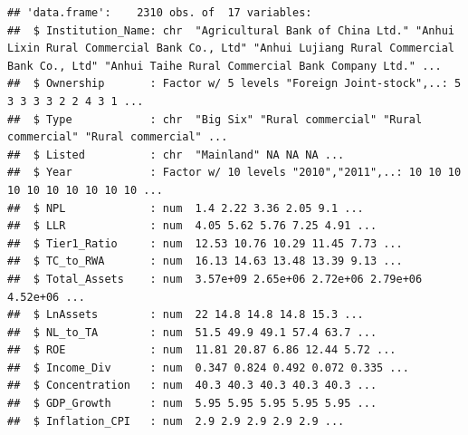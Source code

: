 \documentclass{article}
\begin{document}
\begin{verbatim}
## 'data.frame':    2310 obs. of  17 variables:
##  $ Institution_Name: chr  "Agricultural Bank of China Ltd." "Anhui Lixin Rural Commercial Bank Co., Ltd" "Anhui Lujiang Rural Commercial Bank Co., Ltd" "Anhui Taihe Rural Commercial Bank Company Ltd." ...
##  $ Ownership       : Factor w/ 5 levels "Foreign Joint-stock",..: 5 3 3 3 3 2 2 4 3 1 ...
##  $ Type            : chr  "Big Six" "Rural commercial" "Rural commercial" "Rural commercial" ...
##  $ Listed          : chr  "Mainland" NA NA NA ...
##  $ Year            : Factor w/ 10 levels "2010","2011",..: 10 10 10 10 10 10 10 10 10 10 ...
##  $ NPL             : num  1.4 2.22 3.36 2.05 9.1 ...
##  $ LLR             : num  4.05 5.62 5.76 7.25 4.91 ...
##  $ Tier1_Ratio     : num  12.53 10.76 10.29 11.45 7.73 ...
##  $ TC_to_RWA       : num  16.13 14.63 13.48 13.39 9.13 ...
##  $ Total_Assets    : num  3.57e+09 2.65e+06 2.72e+06 2.79e+06 4.52e+06 ...
##  $ LnAssets        : num  22 14.8 14.8 14.8 15.3 ...
##  $ NL_to_TA        : num  51.5 49.9 49.1 57.4 63.7 ...
##  $ ROE             : num  11.81 20.87 6.86 12.44 5.72 ...
##  $ Income_Div      : num  0.347 0.824 0.492 0.072 0.335 ...
##  $ Concentration   : num  40.3 40.3 40.3 40.3 40.3 ...
##  $ GDP_Growth      : num  5.95 5.95 5.95 5.95 5.95 ...
##  $ Inflation_CPI   : num  2.9 2.9 2.9 2.9 2.9 ...
\end{verbatim}
\end{document}
